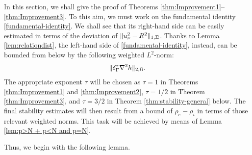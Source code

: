 \documentclass[a4paper,10pt]{amsart}
\numberwithin{equation}{section}
\begin{document}
In this section, we shall give the proof of Theorems \ref{thm:Improvement1}--\ref{thm:Improvement3}. To this aim, we must work on the fundamental identity \eqref{fundamental-identity}. We shall see that its right-hand side can be easily estimated in terms of the  deviation of $\Vert u^2_\nu-R^2\Vert_{1,\Sigma}$. 
Thanks to Lemma \ref{lem:relationdist}, the left-hand side of \eqref{fundamental-identity}, instead, can be bounded from below by the following weighted $L^2$-norm:
\begin{equation}\label{eq:weightdnorm_olal}
\Vert \delta_{\Gamma}^{ \tau } \nabla^2 h \Vert_{2, \Omega}.
\end{equation}
The appropriate exponent $\tau$ will be chosen as $\tau= 1$ in Theorems \ref{thm:Improvement1} and \ref{thm:Improvement2}, $\tau= 1/2$ in Theorem \ref{thm:Improvement3}, and $\tau= 3/2$ in Theorem \ref{thm:stability-general} below. 
The final stability estimates will then result from a bound of $\rho_e -\rho_i$ in terms of those relevant  weighted norms. This task will be achieved by means of Lemma \ref{lem:p>N + p<N and p=N}.
\par
Thus, we begin with the following lemma.
\end{document}
